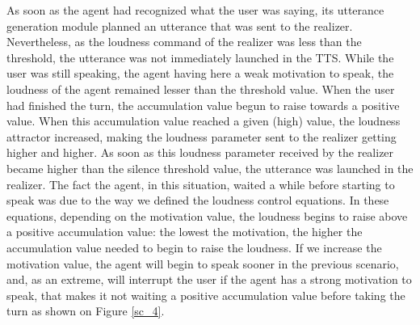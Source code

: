 
As soon as the agent had recognized what the user was saying, its utterance generation module planned an utterance that was sent to the realizer. Nevertheless, as the loudness command of the realizer was less than the threshold, the utterance was not immediately launched in the TTS. 
While the user was still speaking, the agent having here a weak motivation to speak, the loudness of the agent remained lesser than the threshold value. When the user had finished the turn, the accumulation value begun to raise towards a positive value. When this accumulation value reached a given (high) value, the loudness attractor increased, making the loudness parameter sent to the realizer getting higher and higher. As soon as this loudness parameter received by the realizer became higher than the silence threshold value, the utterance was launched in the realizer.
The fact the agent, in this situation, waited a while before starting to speak was due to the way we defined the loudness control equations. In these equations, depending on the motivation value, the loudness begins to raise above a positive accumulation value: the lowest the motivation, the higher the accumulation value needed to begin to raise the loudness. If we increase the motivation value, the agent will begin to speak sooner in the previous scenario, and, as an extreme, will interrupt the user if the agent has a strong motivation to speak, that makes it not waiting a positive accumulation value before taking the turn as shown on Figure \ref{sc_4}. 

